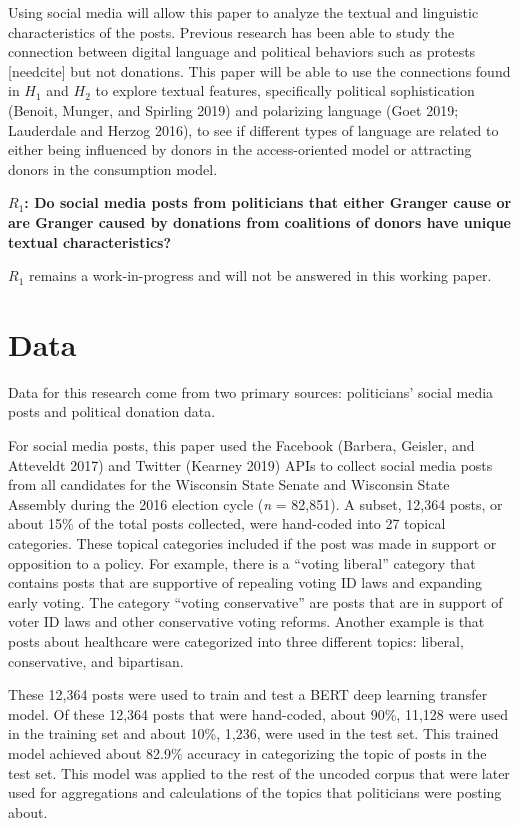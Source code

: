 \documentclass[12pt,]{article}
\begin{document}
Using social media will allow this paper to analyze the textual and
linguistic characteristics of the posts. Previous research has been able
to study the connection between digital language and political behaviors
such as protests {[}needcite{]} but not donations. This paper will be
able to use the connections found in \(H_{1}\) and \(H_{2}\) to explore
textual features, specifically political sophistication (Benoit, Munger,
and Spirling 2019) and polarizing language (Goet 2019; Lauderdale and
Herzog 2016), to see if different types of language are related to
either being influenced by donors in the access-oriented model or
attracting donors in the consumption model.

\textbf{\(R_{1}\): Do social media posts from politicians that either
Granger cause or are Granger caused by donations from coalitions of
donors have unique textual characteristics?}

\(R_{1}\) remains a work-in-progress and will not be answered in this
working paper.

\hypertarget{data}{%
\section{Data}\label{data}}

Data for this research come from two primary sources: politicians'
social media posts and political donation data.

For social media posts, this paper used the Facebook (Barbera, Geisler,
and Atteveldt 2017) and Twitter (Kearney 2019) APIs to collect social
media posts from all candidates for the Wisconsin State Senate and
Wisconsin State Assembly during the 2016 election cycle (\emph{n} =
82,851). A subset, 12,364 posts, or about 15\% of the total posts
collected, were hand-coded into 27 topical categories. These topical
categories included if the post was made in support or opposition to a
policy. For example, there is a ``voting liberal'' category that
contains posts that are supportive of repealing voting ID laws and
expanding early voting. The category ``voting conservative'' are posts
that are in support of voter ID laws and other conservative voting
reforms. Another example is that posts about healthcare were categorized
into three different topics: liberal, conservative, and bipartisan.

These 12,364 posts were used to train and test a BERT deep learning
transfer model. Of these 12,364 posts that were hand-coded, about 90\%,
11,128 were used in the training set and about 10\%, 1,236, were used in
the test set. This trained model achieved about 82.9\% accuracy in
categorizing the topic of posts in the test set. This model was applied
to the rest of the uncoded corpus that were later used for aggregations
and calculations of the topics that politicians were posting about.
\end{document}
